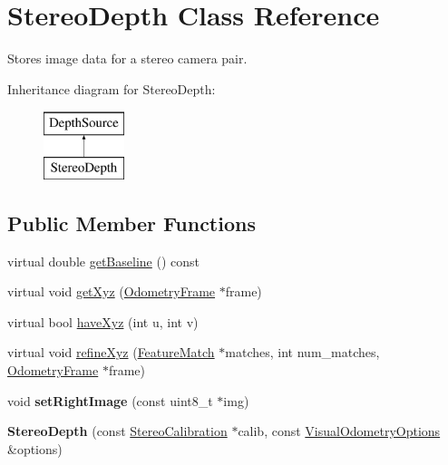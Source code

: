 \hypertarget{classfovis_1_1StereoDepth}{
\section{StereoDepth Class Reference}
\label{classfovis_1_1StereoDepth}
}


Stores image data for a stereo camera pair.  


Inheritance diagram for StereoDepth:\begin{figure}[H]
\begin{center}
\leavevmode
\includegraphics[height=2.000000cm]{classfovis_1_1StereoDepth}
\end{center}
\end{figure}
\subsection*{Public Member Functions}
\begin{DoxyCompactItemize}
\item 
virtual double \hyperlink{classfovis_1_1StereoDepth_a5429ab9acd4e4f8d154c952ff95b1149}{getBaseline} () const 
\item 
virtual void \hyperlink{classfovis_1_1StereoDepth_a0b83e0c45768e90787bc7f0c2c77606d}{getXyz} (\hyperlink{classfovis_1_1OdometryFrame}{OdometryFrame} $\ast$frame)
\item 
virtual bool \hyperlink{classfovis_1_1StereoDepth_ab94d0972d755837688cfc95aa144a6e1}{haveXyz} (int u, int v)
\item 
virtual void \hyperlink{classfovis_1_1StereoDepth_ad0922053f71946f74bc26225848010e6}{refineXyz} (\hyperlink{classfovis_1_1FeatureMatch}{FeatureMatch} $\ast$matches, int num\_\-matches, \hyperlink{classfovis_1_1OdometryFrame}{OdometryFrame} $\ast$frame)
\item 
\hypertarget{classfovis_1_1StereoDepth_a9a80d9547739766e7d8abbb9e2cafb8e}{
void {\bfseries setRightImage} (const uint8\_\-t $\ast$img)}
\label{classfovis_1_1StereoDepth_a9a80d9547739766e7d8abbb9e2cafb8e}

\item 
\hypertarget{classfovis_1_1StereoDepth_ad61e40ec9a733ef28cb90f0593076ca5}{
{\bfseries StereoDepth} (const \hyperlink{classfovis_1_1StereoCalibration}{StereoCalibration} $\ast$calib, const \hyperlink{group__FovisCore_ga113578b67d3e37bc78f1fffd8440e1ff}{VisualOdometryOptions} \&options)}
\label{classfovis_1_1StereoDepth_ad61e40ec9a733ef28cb90f0593076ca5}

\end{DoxyCompactItemize}


